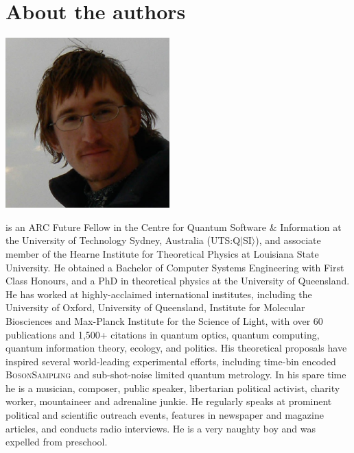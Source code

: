 %
%

\section*{About the authors}

%
%

\begin{center}
\includegraphics[clip=true, width=0.475\textwidth]{photo_peter_rohde}
\end{center}

 is an ARC Future Fellow in the Centre for Quantum Software \& Information at the University of Technology Sydney, Australia (UTS:Q$|$SI$\rangle$), and associate member of the Hearne Institute for Theoretical Physics at Louisiana State University. He obtained a Bachelor of Computer Systems Engineering with First Class Honours, and a PhD in theoretical physics at the University of Queensland. He has worked at highly-acclaimed international institutes, including the University of Oxford, University of Queensland, Institute for Molecular Biosciences and Max-Planck Institute for the Science of Light, with over 60 publications and 1,500+ citations in quantum optics, quantum computing, quantum information theory, ecology, and politics. His theoretical proposals have inspired several world-leading experimental efforts, including time-bin encoded \textsc{BosonSampling} and sub-shot-noise limited quantum metrology. In his spare time he is a musician, composer, public speaker, libertarian political activist, charity worker, mountaineer and adrenaline junkie. He regularly speaks at prominent political and scientific outreach events, features in newspaper and magazine articles, and conducts radio interviews. He is a very naughty boy and was expelled from preschool.

%
%

